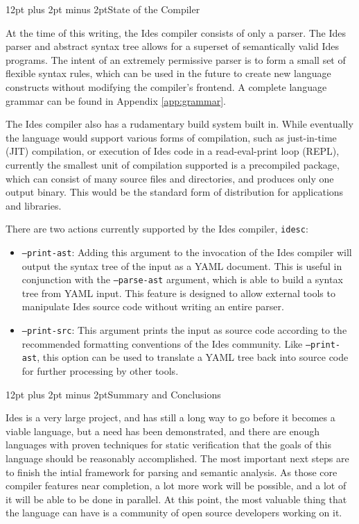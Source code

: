 \documentclass[journal]{IEEEtran}
\makeatletter
\def\code{\texttt}
\def\section{\@startsection {section}{1}{\z@}{24pt plus 2pt minus 2pt}
{12pt plus 2pt minus 2pt}{\large\bf}}
\makeatother
\begin{document}
\section{State of the Compiler}

At the time of this writing, the Ides compiler consists of only a parser. The Ides parser and abstract syntax tree allows for a superset of semantically valid Ides programs. The intent of an extremely permissive parser is to form a small set of flexible syntax rules, which can be used in the future to create new language constructs without modifying the compiler's frontend. A complete language grammar can be found in Appendix \ref{app:grammar}.

The Ides compiler also has a rudamentary build system built in. While eventually the language would support various forms of compilation, such as just-in-time (JIT) compilation, or execution of Ides code in a read-eval-print loop (REPL), currently the smallest unit of compilation supported is a precompiled package, which can consist of many source files and directories, and produces only one output binary. This would be the standard form of distribution for applications and libraries.

There are two actions currently supported by the Ides compiler, \code{idesc}:

\begin{itemize}
  \item \code{--print-ast}: Adding this argument to the invocation of the Ides compiler will output the syntax tree of the input as a YAML\cite{key:yaml} document. This is useful in conjunction with the \code{--parse-ast} argument, which is able to build a syntax tree from YAML input. This feature is designed to allow external tools to manipulate Ides source code without writing an entire parser.

  \item \code{--print-src}: This argument prints the input as source code according to the recommended formatting conventions of the Ides community. Like \code{--print-ast}, this option can be used to translate a YAML tree back into source code for further processing by other tools.
\end{itemize}


\section{Summary and Conclusions}

Ides is a very large project, and has still a long way to go before it becomes a viable language, but a need has been demonstrated, and there are enough languages with proven techniques for static verification that the goals of this language should be reasonably accomplished. The most important next steps are to finish the intial framework for parsing and semantic analysis. As those core compiler features near completion, a lot more work will be possible, and a lot of it will be able to be done in parallel. At this point, the most valuable thing that the language can have is a community of open source developers working on it.
\end{document}

